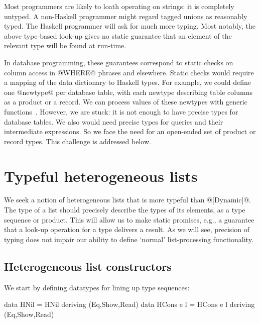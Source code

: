 \documentclass[nocopyrightspace,preprint]{sigplan-proc}
\begin{document}
Most programmers are likely to loath operating on strings: it
is completely untyped. A non-Haskell programmer might regard 
tagged unions as reasonably typed. The Haskell
programmer will ask for much more typing. Most notably, the above
type-based look-up gives no static guarantee that an element of
the relevant type will be found at run-time.

In database programming, these guarantees correspond to static checks
on column access in @WHERE@ phrases and elsewhere. Static checks would
require a mapping of the data dictionary to Haskell types. For
example, we could define one @newtype@ per database table, with each
newtype describing table columns as a product or a record. We can
process values of these newtypes with generic
functions~\cite{LPJ03}. However, we are stuck: it is not enough to
have precise types for database tables. We also would need precise
types for queries and their intermediate expressions. So we face the
need for an open-ended set of product or record types. This challenge
is addressed below.






\section{Typeful heterogeneous lists}
\label{S:HList}

We seek a notion of heterogeneous lists that is more typeful than
@[Dynamic]@. The type of a list should precisely describe the types of
its elements, as a type sequence or product. This will allow us to
make static promises, e.g., a guarantee that a look-up operation for a
type delivers a result. As we will see, precision of typing does not
impair our ability to define `normal' list-processing functionality.

\medskip

\subsection*{Heterogeneous list constructors}

We start by defining datatypes for lining up type sequences:

\begin{code}
 data HNil      = HNil       deriving (Eq,Show,Read)
 data HCons e l = HCons e l  deriving (Eq,Show,Read)
\end{code}
\end{document}
